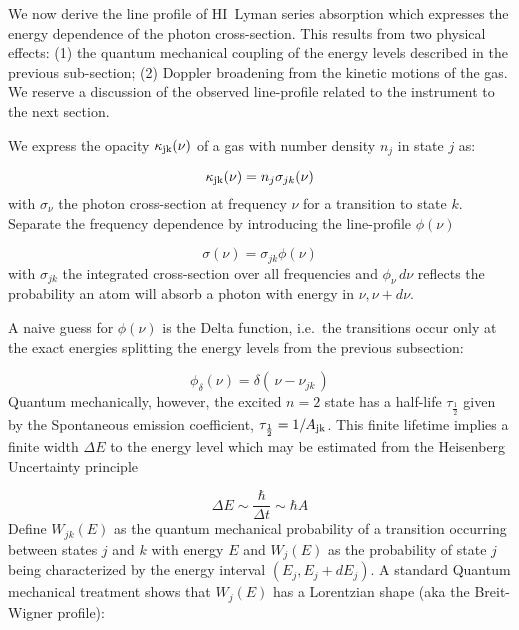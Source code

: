 \documentclass[graybox]{svmult}
\newcommand{\HI}{H{\sc I}}
\def\ohf{\frac{1}{2}}
\def\ltp{\left ( \,}
\def\rtp{\, \right  ) }
\begin{document}
We now derive the line profile of \HI\ Lyman series absorption
which expresses the energy dependence of the
photon cross-section.   This results from two physical
effects: 
(1) the quantum mechanical coupling of the energy
levels described in the previous sub-section; 
(2) Doppler broadening from the kinetic motions of the gas.
We reserve a discussion of the observed
line-profile related to the instrument to the next section.

We express the opacity $\kappa_{\rm jk}(\nu)$
of a gas with number
density $n_j$ in state $j$ as:

\begin{equation} 
\kappa_{\rm jk}(\nu) = n_j \sigma_{jk}(\nu)
\end{equation} 
with $\sigma_\nu$ the photon cross-section 
at frequency $\nu$ for a transition to state $k$.
Separate the frequency dependence by introducing
the line-profile $\phi(\nu)$

\begin{equation}
\sigma(\nu) = \sigma_{jk} \phi(\nu)
\end{equation}
with $\sigma_{jk}$ the integrated cross-section over all frequencies
and $\phi_\nu \, d\nu$ reflects the probability an atom will absorb
a photon with energy in $\nu, \nu + d\nu$.

A naive guess for $\phi(\nu)$ is the Delta function,
i.e.\ the transitions occur only at the exact energies
splitting the energy levels from the previous subsection:

\begin{equation}
\phi_\delta(\nu) = \delta \ltp \nu - \nu_{jk} \rtp
\end{equation}
Quantum mechanically, however, the excited $n=2$
state has a half-life $\tau_\ohf$ 
given by the Spontaneous emission coefficient,
$\tau_\ohf = 1/A_{\rm jk}$.
This finite lifetime implies a finite width
$\Delta E$ to the energy level which may be estimated
from the Heisenberg Uncertainty principle

\begin{equation}
\Delta E \sim \frac{\hbar}{\Delta t} \sim \hbar A
\end{equation}
Define $W_{jk}(E)$ as the quantum mechanical
probability of a transition occurring 
between states $j$ and $k$ with energy $E$
and $W_j(E)$ 
as the probability of state $j$ being characterized
by the energy interval $(E_j, E_j+dE_j)$.
A standard Quantum mechanical treatment shows that
$W_j(E)$ has a Lorentzian shape (aka the Breit-Wigner
profile): 
\end{document}
